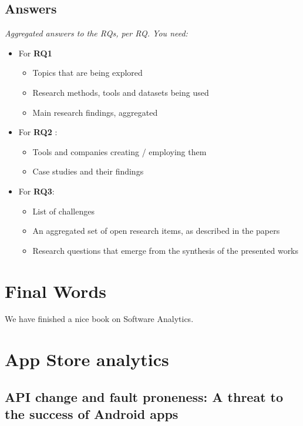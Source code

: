 \documentclass[]{book}
\providecommand{\tightlist}{%
  \setlength{\itemsep}{0pt}\setlength{\parskip}{0pt}}
\begin{document}
\section{Answers}\label{answers}

\emph{Aggregated answers to the RQs, per RQ. You need:}

\begin{itemize}
\tightlist
\item
  For \textbf{RQ1}

  \begin{itemize}
  \tightlist
  \item
    Topics that are being explored
  \item
    Research methods, tools and datasets being used
  \item
    Main research findings, aggregated
  \end{itemize}
\item
  For \textbf{RQ2} :

  \begin{itemize}
  \tightlist
  \item
    Tools and companies creating / employing them
  \item
    Case studies and their findings
  \end{itemize}
\item
  For \textbf{RQ3}:

  \begin{itemize}
  \tightlist
  \item
    List of challenges
  \item
    An aggregated set of open research items, as described in the papers
  \item
    Research questions that emerge from the synthesis of the presented
    works
  \end{itemize}
\end{itemize}

\chapter{Final Words}\label{final-words}

We have finished a nice book on Software Analytics.

\chapter{App Store analytics}\label{app-store-analytics}

\section{API change and fault proneness: A threat to the success of
Android
apps}\label{api-change-and-fault-proneness-a-threat-to-the-success-of-android-apps}
\end{document}

